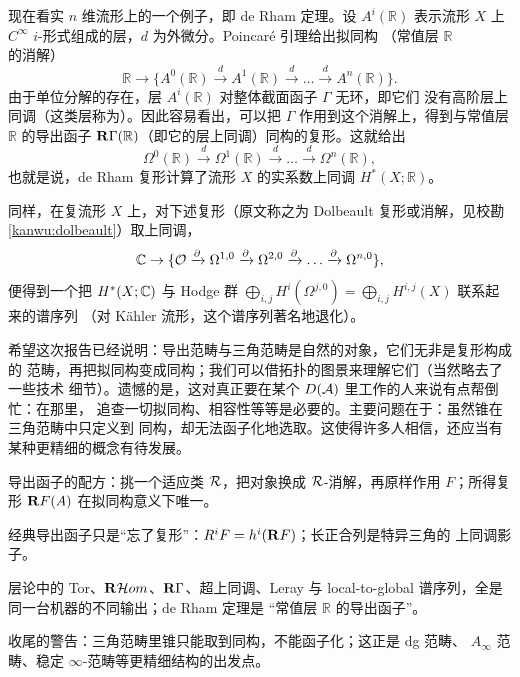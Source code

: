 \begin{eg}\label{eg:derham}
现在看实 $n$ 维流形上的一个例子，即 de Rham 定理。设 $A^i(\mathbb R)$ 表示流形
$X$ 上 $C^\infty$ $i$-形式组成的层，$d$ 为外微分。Poincaré 引理给出拟同构
（常值层 $\mathbb R$ 的消解）
$$
\mathbb R\to\{A^0(\mathbb R)\xrightarrow{d}A^1(\mathbb R)\xrightarrow{d}\ldots
\xrightarrow{d}A^n(\mathbb R)\}.
$$
由于单位分解的存在，层 $A^i(\mathbb R)$ 对整体截面函子 $\Gamma$ 无环，即它们
没有高阶层上同调（这类层称为）。因此容易看出，可以把
$\Gamma$ 作用到这个消解上，得到与常值层 $\mathbb R$ 的导出函子
$\mathbf{R}\Gamma(\mathbb R)$（即它的层上同调）同构的复形。这就给出
$$
\Omega^0(\mathbb R)\xrightarrow{d}\Omega^1(\mathbb R)\xrightarrow{d}\ldots
\xrightarrow{d}\Omega^n(\mathbb R),
$$
也就是说，de Rham 复形计算了流形 $X$ 的实系数上同调 $H^*(X;\mathbb R)$。

同样，在复流形 $X$ 上，对下述复形（原文称之为 Dolbeault 复形或消解，见校勘
\ref{kanwu:dolbeault}）取上同调，
$$
\mathbb{C}\to\{\mathcal{O}\xrightarrow{\partial}\Omega^{1,0}\xrightarrow{\partial}\Omega^{2,0}
\xrightarrow{\partial}\ldots\xrightarrow{\partial}\Omega^{n,0}\},
$$
便得到一个把 $H^*(X;\mathbb{C})$ 与 Hodge 群
$\bigoplus_{i,j}H^i(\Omega^{j,0})=\bigoplus_{i,j}H^{i,j}(X)$ 联系起来的谱序列
（对 Kähler 流形，这个谱序列著名地退化）。
\end{eg}

希望这次报告已经说明：导出范畴与三角范畴是自然的对象，它们无非是复形构成的
范畴，再把拟同构变成同构；我们可以借拓扑的图景来理解它们（当然略去了一些技术
细节）。遗憾的是，这对真正要在某个 $D(\mathcal{A})$ 里工作的人来说有点帮倒忙：在那里，
追查一切拟同构、相容性等等是必要的。主要问题在于：虽然锥在三角范畴中只定义到
同构，却无法函子化地选取。这使得许多人相信，还应当有某种更精细的概念有待发展。

\begin{keytakeaways}
\item 导出函子的配方：挑一个适应类 $\mathcal{R}$，把对象换成 $\mathcal{R}$-消解，再原样作用
  $F$；所得复形 $\mathbf{R} F(A)$ 在拟同构意义下唯一。
\item 经典导出函子只是“忘了复形”：$R^iF=h^i(\mathbf{R} F)$；长正合列是特异三角的
  上同调影子。
\item 层论中的 Tor、$\mathbf{R}\mathcal Hom$、$\mathbf{R}\Gamma$、超上同调、Leray 与
  local-to-global 谱序列，全是同一台机器的不同输出；de Rham 定理是
  “常值层 $\mathbb R$ 的导出函子”。
\item 收尾的警告：三角范畴里锥只能取到同构，不能函子化；这正是 dg 范畴、
  $A_\infty$ 范畴、稳定 $\infty$-范畴等更精细结构的出发点。
\end{keytakeaways}

